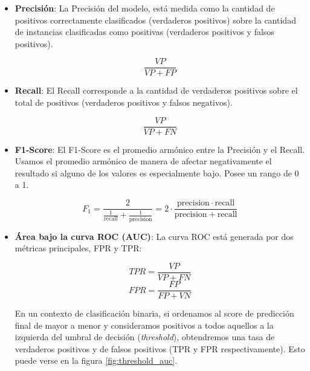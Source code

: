 \begin{itemize}
    \item \textbf{Precisión}: La Precisión del modelo, está medida como la cantidad de positivos correctamente clasificados (verdaderos positivos) sobre la cantidad de instancias clasificadas como positivas (verdaderos positivos y falsos positivos).
    
    \begin{equation*}
        \frac{VP}{VP + FP}
    \end{equation*}
    
    \item \textbf{Recall}: El Recall corresponde a la cantidad de verdaderos positivos sobre el total de positivos (verdaderos positivos y falsos negativos).
    
    \begin{equation*}
        \frac{VP}{VP + FN}
    \end{equation*}
    
    \item \textbf{F1-Score}: El F1-Score es el promedio armónico entre la Precisión y el Recall. Usamos el promedio armónico de manera de afectar negativamente el resultado si alguno de los valores es especialmente bajo. Posee un rango de 0 a 1. 
    
    \begin{equation*}
        F_1 = \frac{2}{\tfrac{1}{\mathrm{recall}} + \tfrac{1}{\mathrm{precision}}} = 2 \cdot \frac{\mathrm{precision} \cdot \mathrm{recall}}{\mathrm{precision} + \mathrm{recall}}
    \end{equation*}
    
    
    \item \textbf{Área bajo la curva ROC (AUC)}: La curva ROC está generada por dos métricas principales, FPR y TPR:
    
    \begin{multicols}{2}
        \begin{equation*}
        TPR = \frac{VP}{VP + FN}
        \end{equation*}
        \break
        \begin{equation*}
        FPR = \frac{FP}{FP + VN} 
        \end{equation*}
    \end{multicols}
    
    En un contexto de clasificación binaria, si ordenamos al score de predicción final de mayor a menor y consideramos positivos a todos aquellos a la izquierda del umbral de decisión (\textit{threshold}), obtendremos una tasa de verdaderos positivos y de falsos positivos (TPR y FPR respectivamente). Esto puede verse en la figura \ref{fig:threshold_auc}.
    

\end{itemize}
